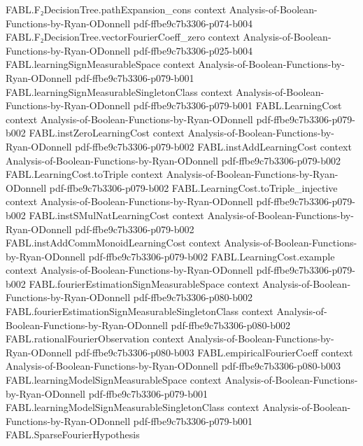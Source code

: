 \begin{theorem}
\proofstep
  {FABL.F₂DecisionTree.pathExpansion_cons}
  {context}
  {Analysis-of-Boolean-Functions-by-Ryan-ODonnell}
  {pdf-ffbe9c7b3306-p074-b004}
\proofstep
  {FABL.F₂DecisionTree.vectorFourierCoeff_zero}
  {context}
  {Analysis-of-Boolean-Functions-by-Ryan-ODonnell}
  {pdf-ffbe9c7b3306-p025-b004}
\proofstep
  {FABL.learningSignMeasurableSpace}
  {context}
  {Analysis-of-Boolean-Functions-by-Ryan-ODonnell}
  {pdf-ffbe9c7b3306-p079-b001}
\proofstep
  {FABL.learningSignMeasurableSingletonClass}
  {context}
  {Analysis-of-Boolean-Functions-by-Ryan-ODonnell}
  {pdf-ffbe9c7b3306-p079-b001}
\proofstep
  {FABL.LearningCost}
  {context}
  {Analysis-of-Boolean-Functions-by-Ryan-ODonnell}
  {pdf-ffbe9c7b3306-p079-b002}
\proofstep
  {FABL.instZeroLearningCost}
  {context}
  {Analysis-of-Boolean-Functions-by-Ryan-ODonnell}
  {pdf-ffbe9c7b3306-p079-b002}
\proofstep
  {FABL.instAddLearningCost}
  {context}
  {Analysis-of-Boolean-Functions-by-Ryan-ODonnell}
  {pdf-ffbe9c7b3306-p079-b002}
\proofstep
  {FABL.LearningCost.toTriple}
  {context}
  {Analysis-of-Boolean-Functions-by-Ryan-ODonnell}
  {pdf-ffbe9c7b3306-p079-b002}
\proofstep
  {FABL.LearningCost.toTriple_injective}
  {context}
  {Analysis-of-Boolean-Functions-by-Ryan-ODonnell}
  {pdf-ffbe9c7b3306-p079-b002}
\proofstep
  {FABL.instSMulNatLearningCost}
  {context}
  {Analysis-of-Boolean-Functions-by-Ryan-ODonnell}
  {pdf-ffbe9c7b3306-p079-b002}
\proofstep
  {FABL.instAddCommMonoidLearningCost}
  {context}
  {Analysis-of-Boolean-Functions-by-Ryan-ODonnell}
  {pdf-ffbe9c7b3306-p079-b002}
\proofstep
  {FABL.LearningCost.example}
  {context}
  {Analysis-of-Boolean-Functions-by-Ryan-ODonnell}
  {pdf-ffbe9c7b3306-p079-b002}
\proofstep
  {FABL.fourierEstimationSignMeasurableSpace}
  {context}
  {Analysis-of-Boolean-Functions-by-Ryan-ODonnell}
  {pdf-ffbe9c7b3306-p080-b002}
\proofstep
  {FABL.fourierEstimationSignMeasurableSingletonClass}
  {context}
  {Analysis-of-Boolean-Functions-by-Ryan-ODonnell}
  {pdf-ffbe9c7b3306-p080-b002}
\proofstep
  {FABL.rationalFourierObservation}
  {context}
  {Analysis-of-Boolean-Functions-by-Ryan-ODonnell}
  {pdf-ffbe9c7b3306-p080-b003}
\proofstep
  {FABL.empiricalFourierCoeff}
  {context}
  {Analysis-of-Boolean-Functions-by-Ryan-ODonnell}
  {pdf-ffbe9c7b3306-p080-b003}
\proofstep
  {FABL.learningModelSignMeasurableSpace}
  {context}
  {Analysis-of-Boolean-Functions-by-Ryan-ODonnell}
  {pdf-ffbe9c7b3306-p079-b001}
\proofstep
  {FABL.learningModelSignMeasurableSingletonClass}
  {context}
  {Analysis-of-Boolean-Functions-by-Ryan-ODonnell}
  {pdf-ffbe9c7b3306-p079-b001}
\proofstep
  {FABL.SparseFourierHypothesis}

\end{theorem}
